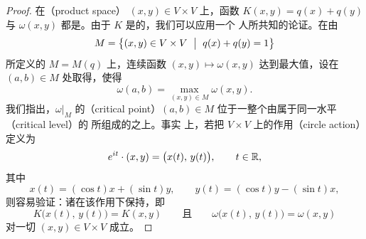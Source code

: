 \begin{proof}
在\textbf{\trProductSpace}（product space） $(x,y)\in V\times V$ 上，函数 $K(x,y)=q(x)+q(y)$ 与 $\omega(x,y)$%
都是\trQuadraticForm。由于 $K$ 是\trPositiveDefinite{}的，我们可以应用一个%
人所共知的\trVariational{}论证。在由
\[
M=\bigl\{(x,y)\in V\times V\ \bigm|\ q(x)+q(y)=1\bigr\}
\]
所定义的\trCompact\trManifold{} $M=M(q)$ 上，连续函数%
$(x,y)\mapsto\omega(x,y)$ 达到最大值，设在 $(a,b)\in M$ 处取得，使得
\[
\omega(a,b)=\max_{(x,y)\in M}\omega(x,y).
\]
我们指出，$\omega|_{M}$ 的\textbf{\trCriticalPoint}（critical point）$(a,b)\in M$%
位于一整个由属于同一\trCritical{}水平（critical level）的\trCriticalPoint{}%
所组成的\trCircle{}之上。事实%
上，若把 $V\times V$ 上的\trCircle{}作用（circle action）定义为
\[
e^{it}\cdot(x,y)=\bigl(x(t),\,y(t)\bigr),\qquad t\in\mathbb{R},
\]
其中
\[
x(t)=(\cos t)x+(\sin t)y,\qquad y(t)=(\cos t)y-(\sin t)x,
\]
则容易验证：诸\trQuadraticForm{}在该作用下保持\trInvariant，即
\[
K\bigl(x(t),\,y(t)\bigr)=K(x,y)\qquad\text{且}\qquad
\omega\bigl(x(t),\,y(t)\bigr)=\omega(x,y)
\]
对一切 $(x,y)\in V\times V$ 成立。


\end{proof}
